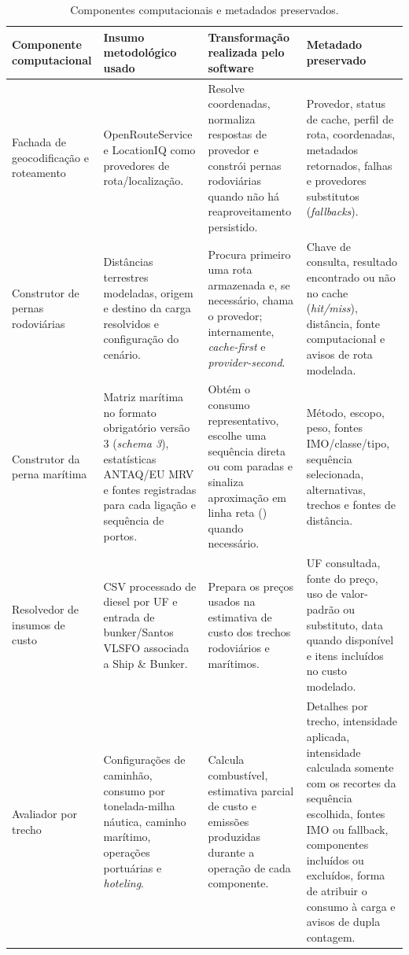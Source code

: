\begin{table}[htbp]
\centering
\footnotesize
\setlength{\tabcolsep}{3pt}
\renewcommand{\arraystretch}{1.15}
\caption{Componentes computacionais e metadados preservados.}
\label{tab:componentes-computacionais}
\begin{tabularx}{\textwidth}{L{0.22\textwidth}L{0.23\textwidth}Y Y}
\toprule
Componente computacional & Insumo metodológico usado & Transformação realizada pelo software & Metadado preservado \\
\midrule
Fachada de geocodificação e roteamento & OpenRouteService e LocationIQ como provedores de rota/localização. & Resolve coordenadas, normaliza respostas de provedor e constrói pernas rodoviárias quando não há reaproveitamento persistido. & Provedor, status de cache, perfil de rota, coordenadas, metadados retornados, falhas e provedores substitutos (\emph{fallbacks}).\\
Construtor de pernas rodoviárias & Distâncias terrestres modeladas, origem e destino da carga resolvidos e configuração do cenário. & Procura primeiro uma rota armazenada e, se necessário, chama o provedor; internamente, \emph{cache-first} e \emph{provider-second}. & Chave de consulta, resultado encontrado ou não no cache (\emph{hit/miss}), distância, fonte computacional e avisos de rota modelada.\\
Construtor da perna marítima & Matriz marítima no formato obrigatório versão 3 (\emph{schema 3}), estatísticas ANTAQ/EU MRV e fontes registradas para cada ligação e sequência de portos. & Obtém o consumo representativo, escolhe uma sequência direta ou com paradas e sinaliza aproximação em linha reta () quando necessário. & Método, escopo, peso, fontes IMO/classe/tipo, sequência selecionada, alternativas, trechos e fontes de distância.\\
Resolvedor de insumos de custo & CSV processado de diesel por UF e entrada de bunker/Santos VLSFO associada a Ship \& Bunker. & Prepara os preços usados na estimativa de custo dos trechos rodoviários e marítimos. & UF consultada, fonte do preço, uso de valor-padrão ou substituto, data quando disponível e itens incluídos no custo modelado.\\
Avaliador por trecho & Configurações de caminhão, consumo por tonelada-milha náutica, caminho marítimo, operações portuárias e \emph{hoteling}. & Calcula combustível, estimativa parcial de custo e emissões produzidas durante a operação de cada componente. & Detalhes por trecho, intensidade aplicada, intensidade calculada somente com os recortes da sequência escolhida, fontes IMO ou fallback, componentes incluídos ou excluídos, forma de atribuir o consumo à carga e avisos de dupla contagem.\\

\end{tabularx}
\end{table}

